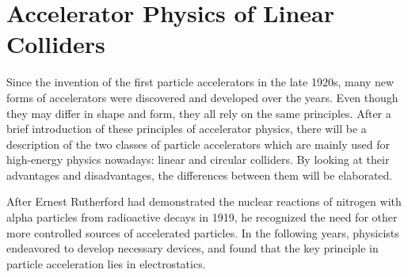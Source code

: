 \chapter{Accelerator Physics of Linear Colliders}
\label{LinearColliderPhysics}

\begin{chapterabstract}
Since the invention of the first particle accelerators in the late 1920s, many new forms of accelerators were discovered and developed over the years. 
Even though they may differ in shape and form, they all rely on the same principles. 
After a brief introduction of these principles of accelerator physics, there will be a description of the two classes of particle accelerators which are mainly used for high-energy physics nowadays: linear and circular colliders. 
By looking at their advantages and disadvantages, the differences between them will be elaborated.
\end{chapterabstract}
\newline

After Ernest Rutherford had demonstrated the nuclear reactions of nitrogen with alpha particles from radioactive decays in 1919, he recognized the need for other more controlled sources of accelerated particles.
In the following years, physicists endeavored to develop necessary devices, and found that the key principle in particle acceleration lies in electrostatics.~\cite[p. 3f]{Livingston}

